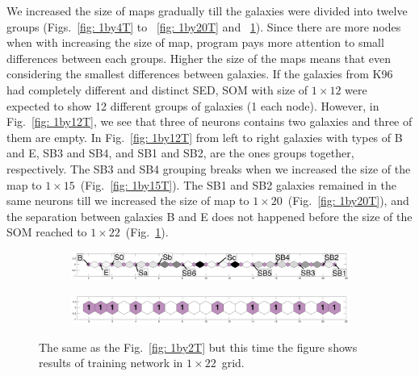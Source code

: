            We increased the size of maps gradually till the galaxies were divided into twelve groups (Figs.~\ref{fig: 1by4T} to ~\ref{fig: 1by20T} and ~\ref{fig: 1by22T}).
            Since there are more nodes when with increasing the size of map, program pays more attention to small differences between each groups.
            Higher the size of the maps means that even considering the smallest differences between galaxies.
            If the galaxies from K96 had completely different and distinct SED, SOM with size of $1\times12$ were expected to show 12 different groups of galaxies (1 each node).
            However, in Fig.~\ref{fig: 1by12T}, we see that three of neurons contains two galaxies and  three of them are empty. 
            In Fig.~\ref{fig: 1by12T} from left to right galaxies with types of B and E, SB3 and SB4, and SB1 and SB2, are the ones groups together, respectively. 
            The SB3 and SB4 grouping breaks when we increased the size of the map to $1\times15$~(Fig.~\ref{fig: 1by15T}).
            The SB1 and SB2 galaxies remained in the same neurons till we increased the size of map to $1\times20$~(Fig.~\ref{fig: 1by20T}), and the separation between galaxies B and E does not happened before the size of the SOM reached to $1\times22$~(Fig.~\ref{fig: 1by22T}).
        \begin{figure}
            \begin{subfigure}[b]{\textwidth}
                \centering
                \includegraphics[width=\textwidth]{../images0.01/1d/dist_1_by_22.png}
            \end{subfigure}
            \hfill
            \begin{subfigure}[b]{\textwidth}
                \includegraphics[width=\textwidth]{../images0.01/1d/hit_t_1_by_22.png}
            \end{subfigure}
            \caption{The same as the Fig.~\ref{fig: 1by2T} but this time the figure shows results of training network in $1\times22$~grid.}
            \label{fig: 1by22T}
        \end{figure}
    
